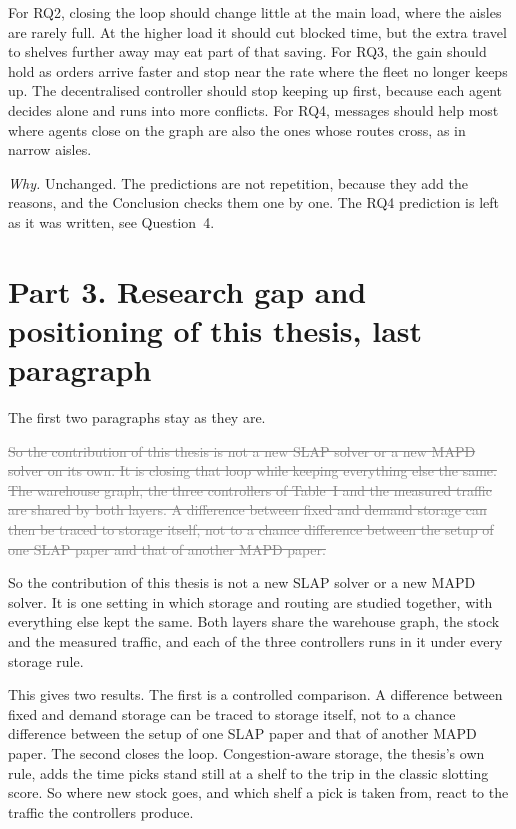 \documentclass[11pt,a4paper]{article}
\newcommand{\new}[1]{\textcolor{newc}{#1}}
\newcommand{\old}[1]{\textcolor{gray}{\sout{#1}}}
\newcommand{\why}[1]{\textcolor{notec}{\small\emph{Why.} #1}\par}
\begin{document}
For RQ2, closing the loop should change little at the main load, where the aisles are rarely full. At
the higher load it should cut blocked time, but the extra travel to shelves further away may eat part
of that saving. For RQ3, the gain should hold as orders arrive faster and stop near the rate where the
fleet no longer keeps up. The decentralised controller should stop keeping up first, because each
agent decides alone and runs into more conflicts. For RQ4, messages should help most where agents
close on the graph are also the ones whose routes cross, as in narrow aisles.

\why{Unchanged. The predictions are not repetition, because they add the reasons, and the Conclusion
checks them one by one. The RQ4 prediction is left as it was written, see Question~4.}

\section*{Part 3. Research gap and positioning of this thesis, last paragraph}

The first two paragraphs stay as they are.

\old{So the contribution of this thesis is not a new SLAP solver or a new MAPD solver on its own. It is
closing that loop while keeping everything else the same. The warehouse graph, the three controllers
of Table~I and the measured traffic are shared by both layers. A difference between fixed and demand
storage can then be traced to storage itself, not to a chance difference between the setup of one
SLAP paper and that of another MAPD paper.}

\new{So the contribution of this thesis is not a new SLAP solver or a new MAPD solver. It is one
setting in which storage and routing are studied together, with everything else kept the same. Both
layers share the warehouse graph, the stock and the measured traffic, and each of the three
controllers runs in it under every storage rule.}

\new{This gives two results. The first is a controlled comparison. A difference between fixed and
demand storage can be traced to storage itself, not to a chance difference between the setup of one
SLAP paper and that of another MAPD paper. The second closes the loop. Congestion-aware storage, the
thesis's own rule, adds the time picks stand still at a shelf to the trip in the classic slotting
score. So where
new stock goes, and which shelf a pick is taken from, react to the traffic the controllers produce.}
\end{document}
